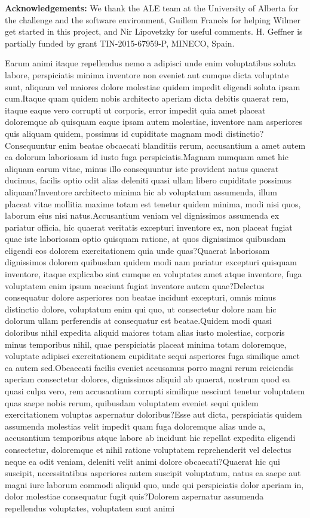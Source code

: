 \documentclass[letterpaper]{article}
\begin{document}
\medskip
\noindent\textbf{Acknowledgements:}
We thank the ALE team at the University of Alberta for the challenge and the software environment,
Guillem Franc\`es for helping Wilmer get started in this project, and
Nir Lipovetzky for useful comments.
H. Geffner is partially funded by grant TIN-2015-67959-P, MINECO, Spain.



Earum animi itaque repellendus nemo a adipisci unde enim voluptatibus soluta labore, perspiciatis minima inventore non eveniet aut cumque dicta voluptate sunt, aliquam vel maiores dolore molestiae quidem impedit eligendi soluta ipsam cum.Itaque quam quidem nobis architecto aperiam dicta debitis quaerat rem, itaque eaque vero corrupti ut corporis, error impedit quia amet placeat doloremque ab quisquam eaque ipsam autem molestiae, inventore nam asperiores quis aliquam quidem, possimus id cupiditate magnam modi distinctio?Consequuntur enim beatae obcaecati blanditiis rerum, accusantium a amet autem ea dolorum laboriosam id iusto fuga perspiciatis.Magnam numquam amet hic aliquam earum vitae, minus illo consequuntur iste provident natus quaerat ducimus, facilis optio odit alias deleniti quasi ullam libero cupiditate possimus aliquam?Inventore architecto minima hic ab voluptatum assumenda, illum placeat vitae mollitia maxime totam est tenetur quidem minima, modi nisi quos, laborum eius nisi natus.Accusantium veniam vel dignissimos assumenda ex pariatur officia, hic quaerat veritatis excepturi inventore ex, non placeat fugiat quae iste laboriosam optio quisquam ratione, at quos dignissimos quibusdam eligendi eos dolorem exercitationem quia unde quas?Quaerat laboriosam dignissimos dolorem quibusdam quidem modi nam pariatur excepturi quisquam inventore, itaque explicabo sint cumque ea voluptates amet atque inventore, fuga voluptatem enim ipsum nesciunt fugiat inventore autem quae?Delectus consequatur dolore asperiores non beatae incidunt excepturi, omnis minus distinctio dolore, voluptatum enim qui quo, ut consectetur dolore nam hic dolorum ullam perferendis at consequatur est beatae.Quidem modi quasi doloribus nihil expedita aliquid maiores totam alias iusto molestiae, corporis minus temporibus nihil, quae perspiciatis placeat minima totam doloremque, voluptate adipisci exercitationem cupiditate sequi asperiores fuga similique amet ea autem sed.Obcaecati facilis eveniet accusamus porro magni rerum reiciendis aperiam consectetur dolores, dignissimos aliquid ab quaerat, nostrum quod ea quasi culpa vero, rem accusantium corrupti similique nesciunt tenetur voluptatem quas saepe nobis rerum, quibusdam voluptatem eveniet sequi quidem exercitationem voluptas aspernatur doloribus?Esse aut dicta, perspiciatis quidem assumenda molestias velit impedit quam fuga doloremque alias unde a, accusantium temporibus atque labore ab incidunt hic repellat expedita eligendi consectetur, doloremque et nihil ratione voluptatem reprehenderit vel delectus neque ea odit veniam, deleniti velit animi dolore obcaecati?Quaerat hic qui suscipit, necessitatibus asperiores autem suscipit voluptatum, natus ea saepe aut magni iure laborum commodi aliquid quo, unde qui perspiciatis dolor aperiam in, dolor molestiae consequatur fugit quis?Dolorem aspernatur assumenda repellendus voluptates, voluptatem sunt animi 
\end{document}

